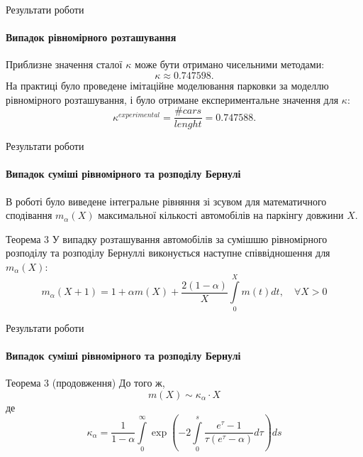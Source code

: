 \begin{frame}{Результати роботи}
	\framesubtitle{Випадок рівномірного розташування}
	Приблизне значення сталої $\kappa$ може бути отримано чисельними методами:
	\[
		\kappa \approx 0.747598.
	\]
	На практиці було проведене імітаційне моделювання парковки за моделлю рівномірного розташування, і було отримане експериментальне значення для $\kappa$:
	\[
		\kappa^{experimental} = \frac{\#cars}{lenght} = 0.747588.
	\]
\end{frame}


\begin{frame}{Результати роботи}
	\framesubtitle{Випадок суміші рівномірного та розподілу Бернулі}
	В роботі було виведене інтегральне рівняння зі зсувом для математичного сподівання $m_\alpha(X)$ максимальної кількості автомобілів на паркінгу довжини $X$.
	\begin{block}{Теорема 3}
	У випадку розташування автомобілів за сумішшю рівномірного розподілу та розподілу Бернуллі виконується наступне співвідношення для $m_\alpha(X)$:
        \[
		m_\alpha(X + 1) = 1 + \alpha m(X) + \frac{2(1-\alpha)}{X} \int\limits_0^{X} m(t) dt,\quad \forall X > 0
        \]
	\end{block}
\end{frame}

\begin{frame}{Результати роботи}
	\framesubtitle{Випадок суміші рівномірного та розподілу Бернулі}
	\begin{block}{Теорема 3 (продовження)}
		До того ж,
		\[
	m(X) \sim  \kappa_\alpha \cdot X
		\]
		де
		\[
			\kappa_\alpha = \frac{1}{1-\alpha}  \int\limits_0^\infty \exp\left( -2\int\limits_0^s \frac{e^{\tau} - 1}{\tau(e^\tau - \alpha)} d\tau  \right) ds 
		\]
	\end{block}
\end{frame}

